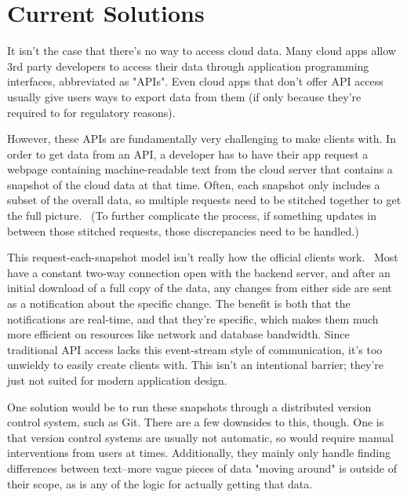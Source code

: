 \documentclass[manuscript,review,anonymous]{acmart}
\begin{document}
\section{Current Solutions}
It isn't the case that there's no way to access cloud data. Many cloud apps allow 3rd party developers to access their data through application programming interfaces, abbreviated as "APIs". Even cloud apps that don't offer API access usually give users ways to export data from them (if only because they're required to for regulatory reasons).~\cite{kramerMakingDataPortability}

However, these APIs are fundamentally very challenging to make clients with. In order to get data from an API, a developer has to have their app request a webpage containing machine-readable text from the cloud server that contains a snapshot of the cloud data at that time. Often, each snapshot only includes a subset of the overall data, so multiple requests need to be stitched together to get the full picture.~\cite{Mainframe} (To further complicate the process, if something updates in between those stitched requests, those discrepancies need to be handled.)

This request-each-snapshot model isn't really how the official clients work.~\cite{spotifyengineeringSpotifyModernizesClientSide2020} Most have a constant two-way connection open with the backend server, and after an initial download of a full copy of the data, any changes from either side are sent as a notification about the specific change. The benefit is both that the notifications are real-time, and that they're specific, which makes them much more efficient on resources like network and database bandwidth. Since traditional API access lacks this event-stream style of communication, it's too unwieldy to easily create clients with. This isn't an intentional barrier; they're just not suited for modern application design.

One solution would be to run these snapshots through a distributed version control system, such as Git. There are a few downsides to this, though. One is that version control systems are usually not automatic, so would require manual interventions from users at times. Additionally, they mainly only handle finding differences between text--more vague pieces of data "moving around" is outside of their scope, as is any of the logic for actually getting that data.
\end{document}
